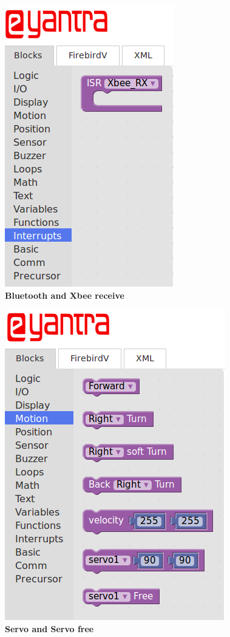 \documentclass[a4paper,12pt,oneside]{book}
\begin{document}
    \begin{center}
    \vspace*{-2cm}\includegraphics[scale =0.6]{xbrec}\\[.3in]
    \textbf{Bluetooth and Xbee receive}\\[1.3in]
    \end{center}
    
    \begin{center}
    \includegraphics[scale =0.6]{servob}\\[.3in]
    \textbf{Servo and Servo free}\\[1.3in]
    \end{center}
    
\end{document}
